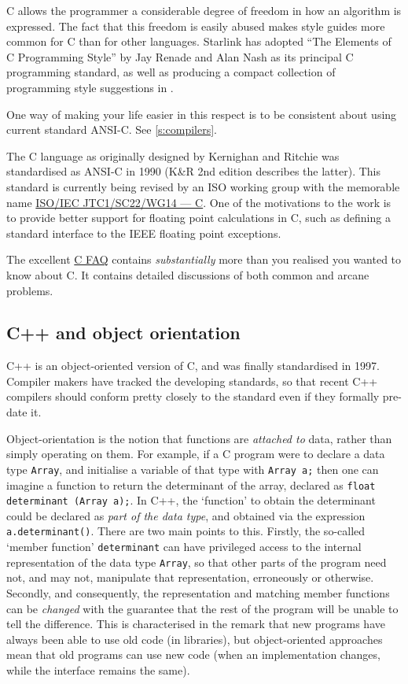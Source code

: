 \documentclass[11pt,oneside,chapters]{starlink}
\begin{document}
C allows the programmer a considerable degree of freedom
in how an algorithm is expressed.  The fact that this
freedom is easily abused makes style guides more common
for C than for other languages.  Starlink has adopted
``The Elements of C Programming Style'' by Jay
Renade and Alan Nash as its principal C programming
standard, as well as producing a compact collection of
programming style suggestions in .

One way of making your life easier in this respect is to
be consistent about using current standard ANSI-C.  See
\ref{s:compilers}.

The C language as originally designed by Kernighan and
Ritchie was standardised as ANSI-C in 1990 (K\&R 2nd
edition describes the latter).  This standard is currently
being revised by an ISO working group with the memorable name
\href{http://std.dkuug.dk/JTC1/SC22/WG14/}{ISO/IEC JTC1/SC22/WG14 --- C}.
One of the motivations to
the work is to provide better support for floating point
calculations in C, such as defining a standard interface
to the IEEE floating point exceptions.

The excellent
\href{http://www.eskimo.com/\%7Escs/C-faq/top.html}{C FAQ}
contains \emph{substantially} more than you
realised you wanted to know about C.  It contains detailed
discussions of both common and arcane problems.


\subsection{C++ and object orientation}

C++ is an object-oriented version of C, and was finally
standardised in 1997.  Compiler makers have tracked the developing
standards, so that recent C++ compilers should conform pretty
closely to the standard even if they formally pre-date it.

Object-orientation is the notion that functions are
\emph{attached to} data, rather than simply operating on
them.  For example, if a C program were to declare a data
type \texttt{Array}, and initialise a variable of that
type with \texttt{Array a;} then one can imagine a
function to return the determinant of the array, declared
as \texttt{float determinant (Array a);}.  In C++, the
`function' to obtain the determinant could be declared as
\emph{part of the data type}, and obtained via the
expression \texttt{a.determinant()}.  There are two
main points to this.  Firstly, the so-called `member
function' \texttt{determinant} can have privileged
access to the internal representation of the data type
\texttt{Array}, so that other parts of the program
need not, and may not, manipulate that representation,
erroneously or otherwise.  Secondly, and consequently, the
representation and matching member functions can be
\emph{changed} with the guarantee that the rest of the
program will be unable to tell the difference.  This is
characterised in the remark that new programs have always
been able to use old code (in libraries), but
object-oriented approaches mean that old programs can use
new code (when an implementation changes, while the
interface remains the same).
\end{document}
